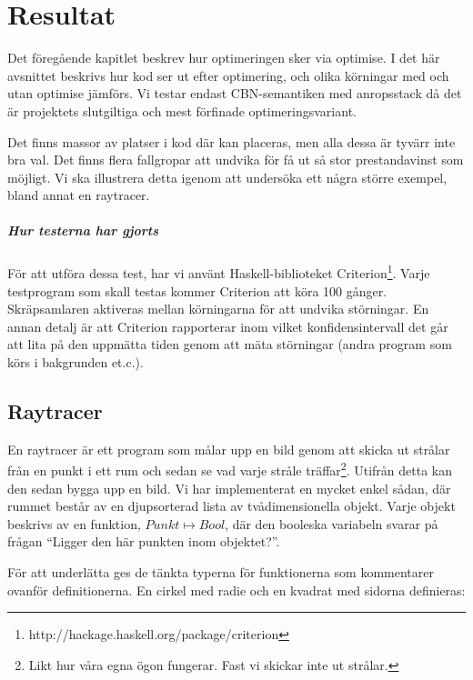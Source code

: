 \documentclass[Rapport]{subfiles}
\begin{document}
\chapter{Resultat}
\label{sec:Resultat}


Det föregående kapitlet beskrev hur optimeringen sker via optimise.
I det här avsnittet beskrivs hur kod ser ut efter optimering, och 
olika körningar med och utan optimise jämförs. 
Vi testar endast CBN-semantiken med anropsstack då det är projektets 
slutgiltiga och mest förfinade optimeringsvariant.

Det finns massor av platser i kod där  kan placeras, men alla dessa är tyvärr 
inte bra val. Det finns flera fallgropar att undvika för få ut så stor 
prestandavinst som möjligt. Vi ska illustrera detta igenom att undersöka ett 
några större exempel, bland annat en raytracer.

\paragraph{Hur testerna har gjorts}
För att utföra dessa test, har vi använt Haskell-biblioteket Criterion\footnote{http://hackage.haskell.org/package/criterion}.
Varje testprogram som skall testas kommer Criterion att köra 100 gånger. Skräpsamlaren
aktiveras mellan körningarna för att undvika störningar.
En annan detalj är att Criterion 
rapporterar inom vilket konfidensintervall det går att lita
på den uppmätta tiden genom att
mäta störningar (andra program som körs
i bakgrunden et.c.).


\section{Raytracer}


En raytracer är ett program som målar upp en bild genom att skicka ut strålar från en punkt
i ett rum och sedan se vad varje stråle träffar\footnote{Likt hur 
våra egna ögon fungerar. Fast vi skickar inte ut strålar.}.
Utifrån detta kan den sedan bygga upp en bild. Vi har implementerat
en mycket enkel sådan, där rummet består av en djupsorterad lista av tvådimensionella objekt.
Varje objekt beskrivs av en funktion, $Punkt \mapsto Bool$, där den booleska
variabeln svarar på frågan ``Ligger den här punkten inom objektet?''.

För att underlätta ges de tänkta typerna för funktionerna som kommentarer ovanför definitionerna.
En cirkel med radie  och en kvadrat med sidorna  definieras:
\end{document}

